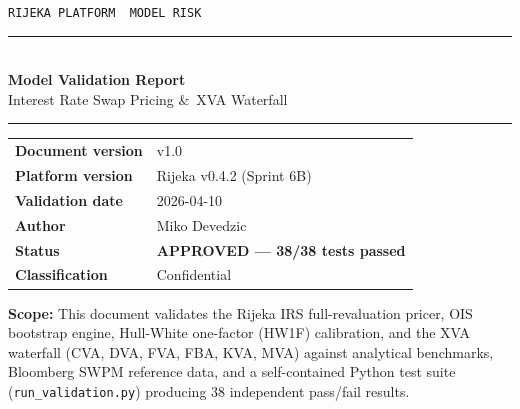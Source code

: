 \documentclass[11pt,a4paper]{article}
\newcommand{\code}[1]{\texttt{\small #1}}
\begin{document}
\begin{titlepage}
  \vspace*{2cm}
  \noindent
  {\footnotesize\color{gray}\texttt{RIJEKA PLATFORM \textemdash\ MODEL RISK}}\\[0.5em]
  {\color{rijekaaccent}\rule{\textwidth}{2pt}}\\[0.5em]
  {\Huge\bfseries Model Validation Report}\\[0.4em]
  {\Large Interest Rate Swap Pricing \&\ XVA Waterfall}\\[0.2em]
  {\color{rijekaaccent}\rule{\textwidth}{0.5pt}}

  \vspace{1.5cm}

  \begin{tabular}{ll}
    \textbf{Document version} & v1.0 \\[0.3em]
    \textbf{Platform version} & Rijeka v0.4.2 (Sprint 6B) \\[0.3em]
    \textbf{Validation date}  & 2026-04-10 \\[0.3em]
    \textbf{Author}           & Miko Devedzic \\[0.3em]
    \textbf{Status}           & \textbf{\color{passteal}APPROVED --- 38/38 tests passed} \\[0.3em]
    \textbf{Classification}   & Confidential \\
  \end{tabular}

  \vspace{2cm}

  \noindent\colorbox{lightteal}{%
    \parbox{\dimexpr\textwidth-2\fboxsep}{%
      \vspace{0.4em}
      \textbf{Scope:} This document validates the Rijeka IRS full-revaluation pricer,
      OIS bootstrap engine, Hull-White one-factor (HW1F) calibration, and the XVA
      waterfall (CVA, DVA, FVA, FBA, KVA, MVA) against analytical benchmarks,
      Bloomberg SWPM reference data, and a self-contained Python test suite
      (\code{run\_validation.py}) producing 38 independent pass/fail results.
      \vspace{0.4em}
    }%
  }

  \vfill
\end{titlepage}
\end{document}
